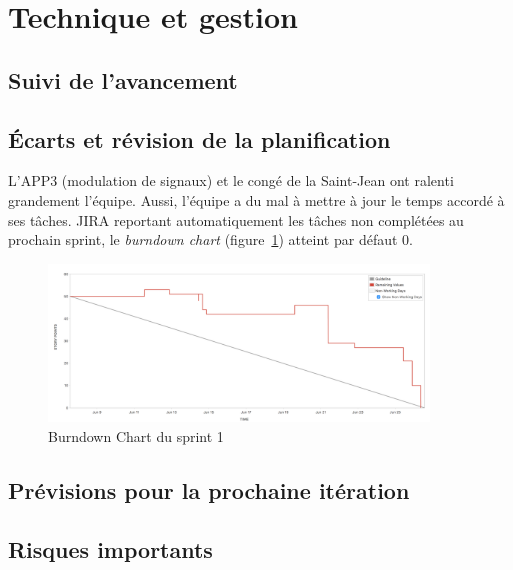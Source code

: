 \section{Technique et gestion}
	\subsection{Suivi de l'avancement}
	

	\subsection{Écarts et révision de la planification}
	\begin{minipage}{0.45\textwidth}
		L'APP3 (modulation de signaux) et le congé de la Saint-Jean ont ralenti grandement l'équipe. Aussi, l'équipe a du mal à mettre à jour le temps accordé à ses tâches. JIRA reportant automatiquement les tâches non complétées au prochain sprint, le \emph{burndown chart} (figure~\ref{fig.burndowm}) atteint par défaut 0.
	\end{minipage}%
	\hfill%
	\begin{minipage}{0.45\textwidth}
		\begin{figure}[H]
			\centering
			\includegraphics[width=0.9\textwidth]{Figures/burndownChart}
			\caption{Burndown Chart du sprint 1}
			\label{fig.burndowm}
		\end{figure}				
	\end{minipage}

	\subsection{Prévisions pour la prochaine itération}
	

	\subsection{Risques importants}
	